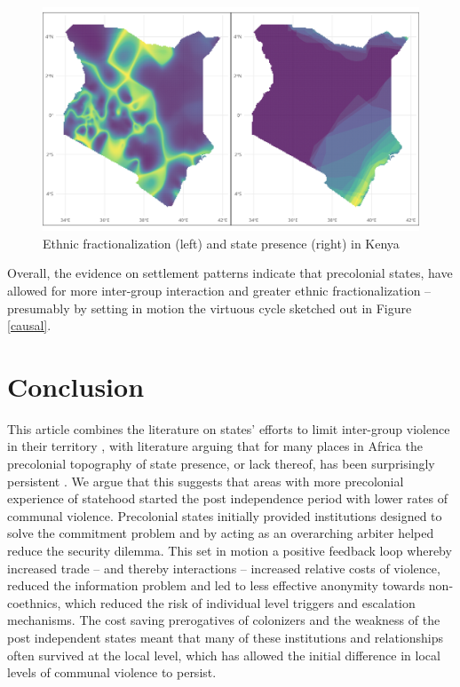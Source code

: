 \begin{figure}[htpb]
	\centering
	\includegraphics[width=1\linewidth]{img/kenplots.png}
	\caption{Ethnic fractionalization (left) and state presence (right) in
	Kenya}%
	\label{kenplots}
\end{figure}

Overall, the evidence on settlement patterns indicate that precolonial states,
have allowed for more inter-group interaction and greater ethnic
fractionalization -- presumably by setting in motion the virtuous cycle sketched
out in Figure \ref{causal}.

\section{Conclusion} \label{Conclusion}

This article combines the literature on states' efforts to limit inter-group
violence in their territory \citep{Olson1993, Pinker2012, tilly_1985}, with
literature arguing that for many places in Africa the precolonial topography of
state presence, or lack thereof, has been surprisingly persistent
\citep{boone2014property, englebert2013inside}. We argue that this suggests that
areas with more precolonial experience of statehood started the post
independence period with lower rates of communal violence. Precolonial states
initially provided institutions designed to solve the commitment problem and by
acting as an overarching arbiter helped reduce the security dilemma. This set in
motion a positive feedback loop whereby increased trade -- and thereby
interactions -- increased relative costs of violence, reduced the information
problem and led to less effective anonymity towards non-coethnics, which reduced
the risk of individual level triggers and escalation mechanisms. The cost saving
prerogatives of colonizers and the weakness of the post independent states
meant that many of these institutions and relationships often survived at the
local level, which has allowed the initial difference in local levels of
communal violence to persist. 

